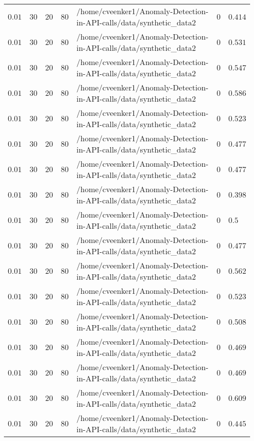 \begin{table}[tbp]
\begin{tabular}{lllllll}
$0.01$ & $30$ & $20$ & $80$ & /home/cveenker1/Anomaly-Detection-in-API-calls/data/synthetic\_data2 & $0$ & $0.414$ \\
$0.01$ & $30$ & $20$ & $80$ & /home/cveenker1/Anomaly-Detection-in-API-calls/data/synthetic\_data2 & $0$ & $0.531$ \\
$0.01$ & $30$ & $20$ & $80$ & /home/cveenker1/Anomaly-Detection-in-API-calls/data/synthetic\_data2 & $0$ & $0.547$ \\
$0.01$ & $30$ & $20$ & $80$ & /home/cveenker1/Anomaly-Detection-in-API-calls/data/synthetic\_data2 & $0$ & $0.586$ \\
$0.01$ & $30$ & $20$ & $80$ & /home/cveenker1/Anomaly-Detection-in-API-calls/data/synthetic\_data2 & $0$ & $0.523$ \\
$0.01$ & $30$ & $20$ & $80$ & /home/cveenker1/Anomaly-Detection-in-API-calls/data/synthetic\_data2 & $0$ & $0.477$ \\
$0.01$ & $30$ & $20$ & $80$ & /home/cveenker1/Anomaly-Detection-in-API-calls/data/synthetic\_data2 & $0$ & $0.477$ \\
$0.01$ & $30$ & $20$ & $80$ & /home/cveenker1/Anomaly-Detection-in-API-calls/data/synthetic\_data2 & $0$ & $0.398$ \\
$0.01$ & $30$ & $20$ & $80$ & /home/cveenker1/Anomaly-Detection-in-API-calls/data/synthetic\_data2 & $0$ & $0.5$ \\
$0.01$ & $30$ & $20$ & $80$ & /home/cveenker1/Anomaly-Detection-in-API-calls/data/synthetic\_data2 & $0$ & $0.477$ \\
$0.01$ & $30$ & $20$ & $80$ & /home/cveenker1/Anomaly-Detection-in-API-calls/data/synthetic\_data2 & $0$ & $0.562$ \\
$0.01$ & $30$ & $20$ & $80$ & /home/cveenker1/Anomaly-Detection-in-API-calls/data/synthetic\_data2 & $0$ & $0.523$ \\
$0.01$ & $30$ & $20$ & $80$ & /home/cveenker1/Anomaly-Detection-in-API-calls/data/synthetic\_data2 & $0$ & $0.508$ \\
$0.01$ & $30$ & $20$ & $80$ & /home/cveenker1/Anomaly-Detection-in-API-calls/data/synthetic\_data2 & $0$ & $0.469$ \\
$0.01$ & $30$ & $20$ & $80$ & /home/cveenker1/Anomaly-Detection-in-API-calls/data/synthetic\_data2 & $0$ & $0.469$ \\
$0.01$ & $30$ & $20$ & $80$ & /home/cveenker1/Anomaly-Detection-in-API-calls/data/synthetic\_data2 & $0$ & $0.609$ \\
$0.01$ & $30$ & $20$ & $80$ & /home/cveenker1/Anomaly-Detection-in-API-calls/data/synthetic\_data2 & $0$ & $0.445$ \\
\hline
\end{tabular}
\end{table}
